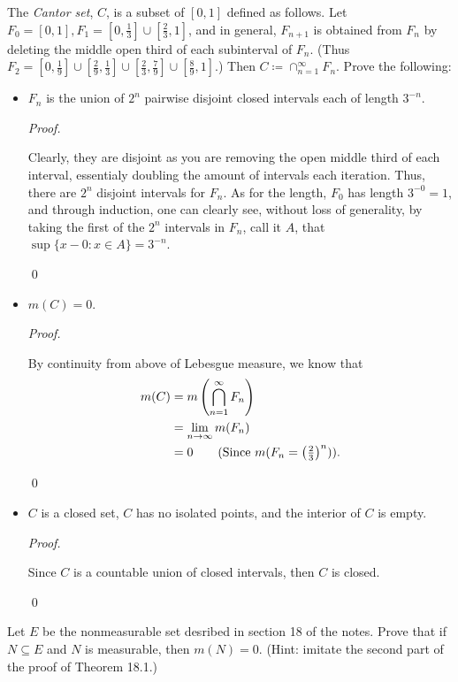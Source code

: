 \documentclass[12pt]{article}
\newenvironment{problem}[2][Problem]{\begin{trivlist}
\item[\hskip \labelsep {\bfseries #1}\hskip \labelsep {\bfseries
#2.}]}{\end{trivlist}}
\newenvironment{sol}
    {\emph{Proof.}
    }
    {
    \qed
    }
\begin{document}
  \begin{problem}{40}
    The \textit{Cantor set}, $C$, is a subset of $[0,1]$ defined as follows. Let $F_0 = [0,1], F_1 = [0,\frac{1}{3}]\cup[\frac{2}{3},1]$, and in general, $F_{n+1}$ is obtained from $F_n$ by deleting the middle open third of each subinterval of $F_n$. (Thus $F_2 = [0,\frac{1}{9}]\cup[\frac{2}{9},\frac{1}{3}]\cup[\frac{2}{3},\frac{7}{9}]\cup[\frac{8}{9},1]$.) Then $C \coloneqq \cap_{n = 1}^{\infty}F_n$. Prove the following:
    \begin{itemize}
      \item[(a)] $F_n$ is the union of $2^n$ pairwise disjoint closed intervals each of length $3^{-n}$.
       
      \begin{sol}
        Clearly, they are disjoint as you are removing the open middle third of each interval, essentialy doubling the amount of intervals each iteration. Thus, there are $2^n$ disjoint intervals for $F_n$. As for the length, $F_0$ has length $3^{-0} = 1$, and through induction, one can clearly see, without loss of generality, by taking the first of the $2^n$ intervals in $F_n$, call it $A$, that $\sup\{x - 0 : x \in A\} = 3^{-n}$.
      \end{sol}
  
      \item[(b)] $m(C) = 0$.
      
      \begin{sol}
        By continuity from above of Lebesgue measure, we know that 
        \begin{align*}
          m(C) &= m\left(\bigcap_{n = 1}^{\infty}F_n\right) \\
          &= \lim_{n \to \infty} m(F_n) \\
          &= 0 \tag*{(Since $m(F_n = \left(\frac{2}{3} \right)^n)$)}.
        \end{align*}
      \end{sol}
  
      \item[(c)] $C$ is a closed set, $C$ has no isolated points, and the interior of $C$ is empty.  
      
      \begin{sol}
        Since $C$ is a countable union of closed intervals, then $C$ is closed.
      \end{sol}
    \end{itemize}
  \end{problem}

  \begin{problem}{41}
    Let $E$ be the nonmeasurable set desribed in section 18 of the notes. Prove that if $N \subseteq E$ and $N$ is measurable, then $m(N) = 0$. (Hint: imitate the second part of the proof of Theorem 18.1.)
    \end{problem}
    
\end{document}
